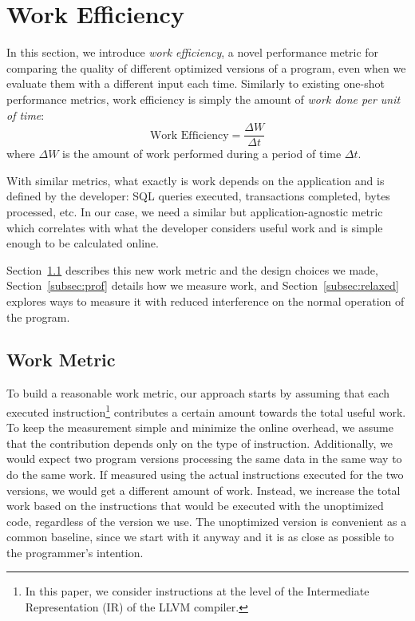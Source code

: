 \section{Work Efficiency} \label{sec:work}

    In this section, we introduce \textit{work efficiency}, a novel performance metric for comparing the quality of different optimized
    versions of a program, even when we evaluate them with a different input each time. Similarly to existing one-shot performance metrics,
    work efficiency is simply the amount of \textit{work done per unit of time}: 
    \[
        \textrm{Work Efficiency} = \frac{\Delta W}{\Delta t}
    \]
    where $\Delta W$ is the amount of work performed during a period of time $\Delta t$.

    With similar metrics, what exactly is work depends on the application and is defined by the developer: SQL queries executed,
    transactions completed, bytes processed, etc. In our case, we need a similar but application-agnostic metric which correlates with what
    the developer considers useful work and is simple enough to be calculated online.

    Section~\ref{subsec:workmetric} describes this new work metric and the design choices we made, Section~\ref{subsec:prof} details how
    we measure work, and Section~\ref{subsec:relaxed} explores ways to measure it with reduced interference on %
    the normal operation of the program.

    \subsection{Work Metric} \label{subsec:workmetric}

    To build a reasonable work metric, our approach starts by assuming that each executed instruction\footnote{In this paper, we consider instructions at the level of the Intermediate Representation (IR) of the LLVM compiler.} contributes a certain amount towards
    the total useful work. To keep the measurement simple and minimize the online overhead, we assume that the contribution depends only on
    the type of instruction. Additionally, we would expect two program versions processing the same data in the same way to do the same
    work. If measured using the actual instructions executed for the two versions, we would get a different amount of work. Instead, we
    increase the total work based on the instructions that would be executed with the unoptimized code, regardless of the version we use.
    The unoptimized version is convenient as a common baseline, since we start with it anyway and it is as close as possible to the
    programmer's intention.

